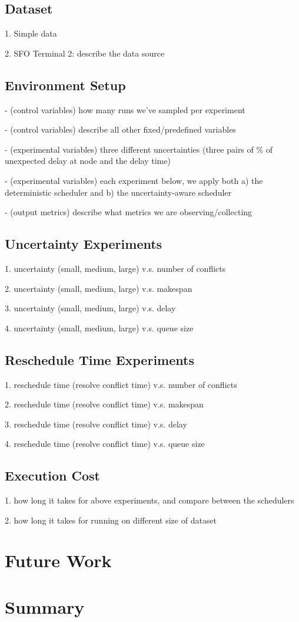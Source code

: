 \documentclass[letterpaper, 10 pt, conference]{ieeeconf}
\begin{document}
\subsection{Dataset}

1. Simple data

2. SFO Terminal 2: describe the data source

\subsection{Environment Setup}

- (control variables) how many runs we've sampled per experiment

- (control variables) describe all other fixed/predefined variables

- (experimental variables) three different uncertainties (three pairs of \% of unexpected delay at node and the delay time)

- (experimental variables) each experiment below, we apply both a) the deterministic scheduler and b) the uncertainty-aware scheduler

- (output metrics) describe what metrics we are observing/collecting

\subsection{Uncertainty Experiments}

1. uncertainty (small, medium, large) v.s. number of conflicts

2. uncertainty (small, medium, large) v.s. makespan

3. uncertainty (small, medium, large) v.s. delay

4. uncertainty (small, medium, large) v.s. queue size

\subsection{Reschedule Time Experiments}

1. reschedule time (resolve conflict time) v.s. number of conflicts

2. reschedule time (resolve conflict time) v.s. makespan

3. reschedule time (resolve conflict time) v.s. delay

4. reschedule time (resolve conflict time) v.s. queue size

\subsection{Execution Cost}

1. how long it takes for above experiments, and compare between the schedulers

2. how long it takes for running on different size of dataset

\section{Future Work}
\section{Summary}


\end{document}
